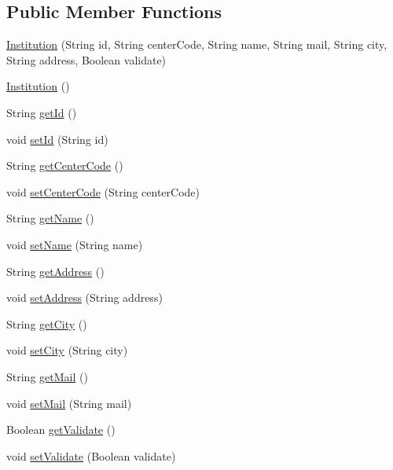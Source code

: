 \subsection*{Public Member Functions}
\begin{DoxyCompactItemize}
\item 
\mbox{\hyperlink{classcom_1_1osoc_1_1oncera_1_1javabean_1_1_institution_affbd43ab22ee9859bd1cfd0da7b79449}{Institution}} (String id, String center\+Code, String name, String mail, String city, String address, Boolean validate)
\item 
\mbox{\hyperlink{classcom_1_1osoc_1_1oncera_1_1javabean_1_1_institution_ac86c6aef0a85263fa9e26b627f240e32}{Institution}} ()
\item 
String \mbox{\hyperlink{classcom_1_1osoc_1_1oncera_1_1javabean_1_1_institution_a1df53283d564fb75a18c446750f25932}{get\+Id}} ()
\item 
void \mbox{\hyperlink{classcom_1_1osoc_1_1oncera_1_1javabean_1_1_institution_ac93a412c3842a7a205c6afb2c8c08f97}{set\+Id}} (String id)
\item 
String \mbox{\hyperlink{classcom_1_1osoc_1_1oncera_1_1javabean_1_1_institution_af7a78fdb96ef9fa92ad687d01b619185}{get\+Center\+Code}} ()
\item 
void \mbox{\hyperlink{classcom_1_1osoc_1_1oncera_1_1javabean_1_1_institution_ac739e63164bb482e3a2ebacf0481c52e}{set\+Center\+Code}} (String center\+Code)
\item 
String \mbox{\hyperlink{classcom_1_1osoc_1_1oncera_1_1javabean_1_1_institution_a37ff679d824d0173e01acbad1e72688c}{get\+Name}} ()
\item 
void \mbox{\hyperlink{classcom_1_1osoc_1_1oncera_1_1javabean_1_1_institution_af98082aec13a0adfbd229b6af2462bab}{set\+Name}} (String name)
\item 
String \mbox{\hyperlink{classcom_1_1osoc_1_1oncera_1_1javabean_1_1_institution_ae9b242ae00fa3c8a4955485fbcfed197}{get\+Address}} ()
\item 
void \mbox{\hyperlink{classcom_1_1osoc_1_1oncera_1_1javabean_1_1_institution_ad3fdd13cd3c0a114c48fa1b5a8209f91}{set\+Address}} (String address)
\item 
String \mbox{\hyperlink{classcom_1_1osoc_1_1oncera_1_1javabean_1_1_institution_a89ce3699c9e3868a6b6e0989fc374975}{get\+City}} ()
\item 
void \mbox{\hyperlink{classcom_1_1osoc_1_1oncera_1_1javabean_1_1_institution_aa627d7a27e997a6b75d932e1d67ead47}{set\+City}} (String city)
\item 
String \mbox{\hyperlink{classcom_1_1osoc_1_1oncera_1_1javabean_1_1_institution_a13138d8abd40441fc2dcf54c32dfaf22}{get\+Mail}} ()
\item 
void \mbox{\hyperlink{classcom_1_1osoc_1_1oncera_1_1javabean_1_1_institution_a7e0b99a8b5cb06fba9086e85ece27c68}{set\+Mail}} (String mail)
\item 
Boolean \mbox{\hyperlink{classcom_1_1osoc_1_1oncera_1_1javabean_1_1_institution_a74d9f8512be7e9620ea7b275c27773ad}{get\+Validate}} ()
\item 
void \mbox{\hyperlink{classcom_1_1osoc_1_1oncera_1_1javabean_1_1_institution_a9f1ba1b37a9383631742641c07a54cff}{set\+Validate}} (Boolean validate)
\end{DoxyCompactItemize}


